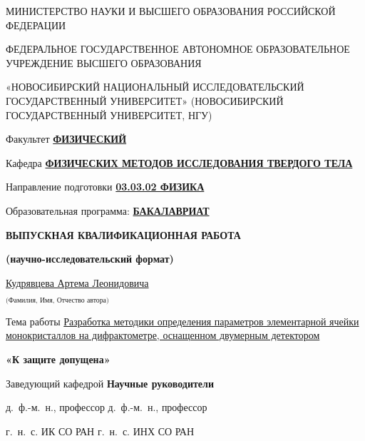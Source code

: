 \begin{titlepage}
\thispagestyle{empty}
\begin{spacing}{1.15}
\footnotesize
\begin{center}
    МИНИСТЕРСТВО НАУКИ И ВЫСШЕГО ОБРАЗОВАНИЯ РОССИЙСКОЙ ФЕДЕРАЦИИ
    \vspace{20pt}

    ФЕДЕРАЛЬНОЕ ГОСУДАРСТВЕННОЕ АВТОНОМНОЕ ОБРАЗОВАТЕЛЬНОЕ\\
    УЧРЕЖДЕНИЕ ВЫСШЕГО ОБРАЗОВАНИЯ
    \vspace{6pt}

    «НОВОСИБИРСКИЙ НАЦИОНАЛЬНЫЙ ИССЛЕДОВАТЕЛЬСКИЙ ГОСУДАРСТВЕННЫЙ УНИВЕРСИТЕТ» (НОВОСИБИРСКИЙ ГОСУДАРСТВЕННЫЙ УНИВЕРСИТЕТ, НГУ)
    \vspace{10pt}
\end{center}
Факультет \uline{\textbf{ФИЗИЧЕСКИЙ}}
\vspace{10pt}

\noindent
Кафедра \uline{\textbf{ФИЗИЧЕСКИХ МЕТОДОВ ИССЛЕДОВАНИЯ ТВЕРДОГО ТЕЛА}}
\vspace{8mm}

\noindent
Направление подготовки \uline{\textbf{03.03.02 ФИЗИКА}}
\vspace{10pt}

\noindent
Образовательная программа: \uline{\textbf{БАКАЛАВРИАТ}}
\vspace{8mm}
\begin{center}
    \textbf{ВЫПУСКНАЯ КВАЛИФИКАЦИОННАЯ РАБОТА}

    \textbf{(научно-исследовательский формат)}
    \vspace{8mm}

    \uline{\hfill Кудрявцева Артема Леонидовича \hfill}

    $_\text{(Фамилия, Имя, Отчество автора)}$
    \vspace{8mm}
\end{center}
Тема работы \uline{Разработка методики определения параметров элементарной ячейки монокристаллов на дифрактометре, оснащенном двумерным детектором\hfill}
\vfill

\noindent
\textbf{«К защите допущена»}

\noindent
Заведующий кафедрой \hfill \textbf{Научные руководители}
\vspace{10pt}

\noindent
д.~ф.-м.~н., профессор \hfill д.~ф.-м.~н., профессор
\vspace{10pt}

\noindent
г.~н.~с. ИК СО РАН \hfill г.~н.~с. ИНХ СО РАН
\vspace{10pt}


\end{spacing}
\end{titlepage}
